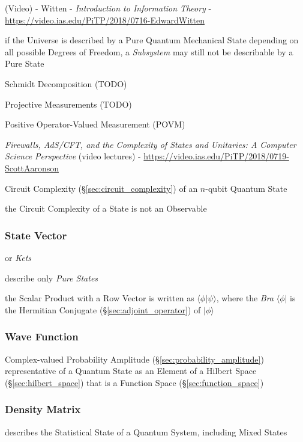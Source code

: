 (Video) - Witten - \emph{Introduction to Information Theory} -
\url{https://video.ias.edu/PiTP/2018/0716-EdwardWitten}

if the Universe is described by a Pure Quantum Mechanical State depending on all
possible Degrees of Freedom, a \emph{Subsystem} may still not be describable by
a Pure State

Schmidt Decomposition (TODO)

Projective Measurements (TODO)

Positive Operator-Valued Measurement (POVM)

\emph{Firewalls, AdS/CFT, and the Complexity of States and Unitaries: A Computer
  Science Perspective}
(video lectures)
-
\url{https://video.ias.edu/PiTP/2018/0719-ScottAaronson}

Circuit Complexity (\S\ref{sec:circuit_complexity}) of an $n$-qubit Quantum
State

the Circuit Complexity of a State is not an Observable



\subsubsection{State Vector}\label{sec:state_vector}

or \emph{Kets}

describe only \emph{Pure States}

the Scalar Product with a Row Vector is written as $\langle\phi|\psi\rangle$,
where the \emph{Bra} $\langle\phi|$ is the Hermitian Conjugate
(\S\ref{sec:adjoint_operator}) of $|\phi\rangle$



\subsubsection{Wave Function}\label{sec:wave_function}

Complex-valued Probability Amplitude (\S\ref{sec:probability_amplitude})
representative of a Quantum State as an Element of a Hilbert Space
(\S\ref{sec:hilbert_space}) that is a Function Space
(\S\ref{sec:function_space})



\subsubsection{Density Matrix}\label{sec:density_matrix}

describes the Statistical State of a Quantum System, including Mixed States

